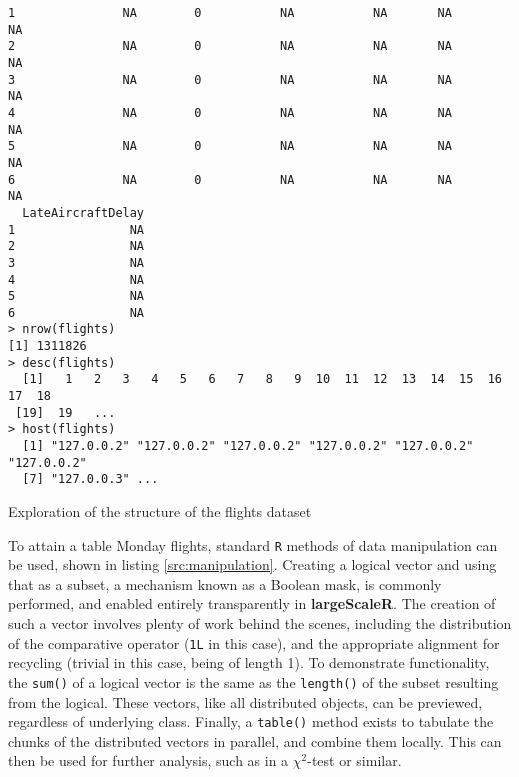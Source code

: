 \begin{listing}[H]
\begin{verbatim}
1               NA        0           NA           NA       NA            NA
2               NA        0           NA           NA       NA            NA
3               NA        0           NA           NA       NA            NA
4               NA        0           NA           NA       NA            NA
5               NA        0           NA           NA       NA            NA
6               NA        0           NA           NA       NA            NA
  LateAircraftDelay
1                NA
2                NA
3                NA
4                NA
5                NA
6                NA
> nrow(flights)
[1] 1311826
> desc(flights)
  [1]   1   2   3   4   5   6   7   8   9  10  11  12  13  14  15  16  17  18
 [19]  19   ...
> host(flights)
  [1] "127.0.0.2" "127.0.0.2" "127.0.0.2" "127.0.0.2" "127.0.0.2" "127.0.0.2"
  [7] "127.0.0.3" ...
\end{verbatim}
\caption{Exploration of the structure of the flights dataset}\label{src:flights-structure}
\end{listing}

To attain a table Monday flights, standard \texttt{R} methods of data manipulation can be used, shown in listing \ref{src:manipulation}.
Creating a logical vector and using that as a subset, a mechanism known as a Boolean mask, is commonly performed, and enabled entirely transparently in \textbf{largeScaleR}.
The creation of such a vector involves plenty of work behind the scenes, including the distribution of the comparative operator (\texttt{1L} in this case), and the appropriate alignment for recycling (trivial in this case, being of length 1).
To demonstrate functionality, the \texttt{sum()} of a logical vector is the same as the \texttt{length()} of the subset resulting from the logical.
These vectors, like all distributed objects, can be previewed, regardless of underlying class.
Finally, a \texttt{table()} method exists to tabulate the chunks of the distributed vectors in parallel, and combine them locally.
This can then be used for further analysis, such as in a \(\chi^2\)-test or similar.

